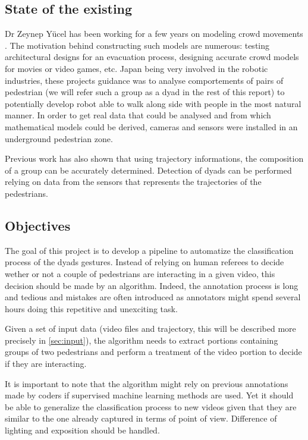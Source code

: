 \documentclass[12pt,a4paper,twoside]{article}
\begin{document}
\subsection{State of the existing}
Dr Zeynep Yücel has been working for a few years on modeling crowd movements \cite{Zanlungo2017}\cite{Yucel2013}\cite{Yucel2017}. The motivation behind constructing such models are numerous: testing architectural designs for an evacuation process, designing accurate crowd models for movies or video games, etc. Japan being very involved in the robotic industries, these projects guidance was to analyse comportements of pairs of pedestrian (we will refer such a group as a dyad in the rest of this report) to potentially develop robot able to walk along side with people in the most natural manner. In order to get real data that could be analysed and from which mathematical models could be derived, cameras and sensors were installed in an underground pedestrian zone. 

Previous work \cite{Yucel2013} has also shown that using trajectory informations, the composition of a group can be accurately determined. Detection of dyads can be performed relying on data from the sensors that represents the trajectories of the pedestrians.

\subsection{Objectives}
The goal of this project is to develop a pipeline to automatize the classification process of the dyads gestures. Instead of relying on human referees to decide wether or not a couple of pedestrians are interacting in a given video, this decision should be made by an algorithm. Indeed, the annotation process is long and tedious and mistakes are often introduced as annotators might spend several hours doing this repetitive and unexciting task.

Given a set of input data (video files and trajectory, this will be described more precisely in \ref{sec:input}), the algorithm needs to extract portions containing groups of two pedestrians and perform a treatment of the video portion to decide if they are interacting.

It is important to note that the algorithm might rely on previous annotations made by coders if supervised machine learning methods are used. Yet it should be able to generalize the classification process to new videos given that they are similar to the one already captured in terms of point of view. Difference of lighting and exposition should be handled.
\end{document}
